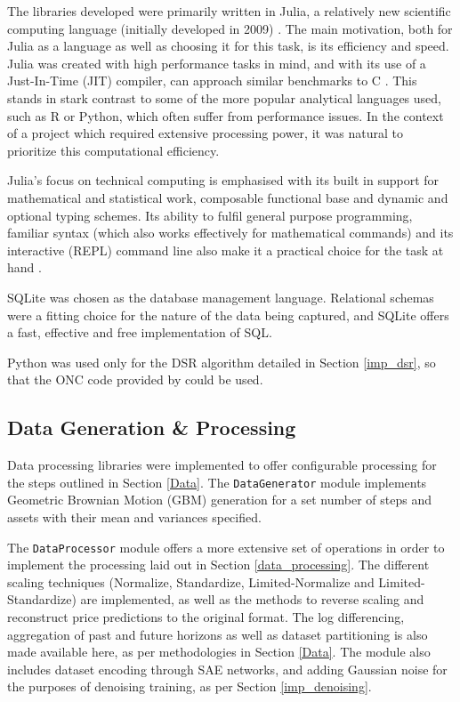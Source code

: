 \documentclass[a4paper,11pt,oneside]{article}
\theoremstyle{plain}
\theoremstyle{definition}
\begin{document}
	The libraries developed were primarily written in Julia, a relatively new scientific computing language (initially developed in 2009) \citep{DCRoot, Julia}. The main motivation, both for Julia as a language as well as choosing it for this task, is its efficiency and speed. Julia was created with high performance tasks in mind, and with its use of a Just-In-Time (JIT) compiler, can approach similar benchmarks to C \citep{Perkel}. This stands in stark contrast to some of the more popular analytical languages used, such as R or Python, which often suffer from performance issues. In the context of a project which required extensive processing power, it was natural to prioritize this computational efficiency. \newline
	
	Julia's focus on technical computing is emphasised with its built in support for mathematical and statistical work, composable functional base and dynamic and optional typing schemes. Its ability to fulfil general purpose programming, familiar syntax (which also works effectively for mathematical commands) and its interactive (REPL) command line also make it a practical choice for the task at hand \citep{Perkel}.\newline
	
	SQLite was chosen as the database management language. Relational schemas were a fitting choice for the nature of the data being captured, and SQLite offers a fast, effective and free implementation of SQL.\newline
	
	Python was used only for the DSR algorithm detailed in Section \ref{imp_dsr}, so that the ONC code provided by \citet{PradoDSR} could be used.\newline
	
	\subsection{Data Generation \& Processing}
	
	Data processing libraries were implemented to offer configurable processing for the steps outlined in Section \ref{Data}. The \texttt{DataGenerator} module \citep{DCDataGenerator} implements Geometric Brownian Motion (GBM) generation for a set number of steps and assets with their mean and variances specified. \newline
	
	The \texttt{DataProcessor} module \citep{DCDataProcessor} offers a more extensive set of operations in order to implement the processing laid out in Section \ref{data_processing}. The different scaling techniques (Normalize, Standardize, Limited-Normalize and Limited-Standardize) are implemented, as well as the methods to reverse scaling and reconstruct price predictions to the original format. The log differencing, aggregation of past and future horizons as well as dataset partitioning is also made available here, as per methodologies in Section \ref{Data}. The module also includes dataset encoding through SAE networks, and adding Gaussian noise for the purposes of denoising training, as per Section \ref{imp_denoising}.\newline
		
\end{document}
